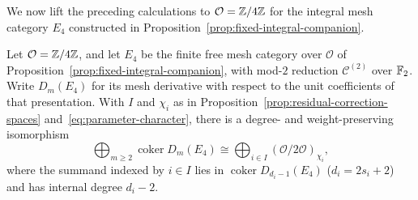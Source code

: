 We now lift the preceding calculations to $\mathcal O=\mathbb Z/4\mathbb Z$ for the integral mesh category $E_4$ constructed in Proposition~\ref{prop:fixed-integral-companion}.

\begin{lemma}
\label{lem:integral-mesh-cokernels}
Let $\mathcal O=\mathbb Z/4\mathbb Z$, and let $E_4$ be the finite free mesh category over $\mathcal O$ of Proposition~\ref{prop:fixed-integral-companion}, with mod-$2$ reduction $\mathcal C^{(2)}$ over $\mathbb F_2$. Write $D_m(E_4)$ for its mesh derivative with respect to the unit coefficients of that presentation. With $I$ and $\chi_i$ as in Proposition~\ref{prop:residual-correction-spaces} and~\eqref{eq:parameter-character}, there is a degree- and weight-preserving isomorphism
\[
  \bigoplus_{m\geq2}\operatorname{coker}D_m(E_4)
  \cong\bigoplus_{i\in I}(\mathcal O/2\mathcal O)_{\chi_i},
\]
where the summand indexed by $i\in I$ lies in $\operatorname{coker}D_{d_i-1}(E_4)$ ($d_i=2s_i+2$) and has internal degree $d_i-2$.
\end{lemma}
